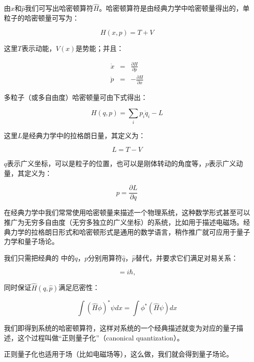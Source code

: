 由$\hat x$和$\hat p$我们可写出哈密顿算符$\hat H$。哈密顿算符是由经典力学中哈密顿量得出的，单粒子的哈密顿量可写为：

\begin{equation}
H(x,p)=T+V
\end{equation}

这里$T$表示动能，$V(x)$是势能；并且：

\begin{eqnarray}
\dot x &=& \frac{\partial H}{\partial p}  \\
\dot p &=& - \frac{\partial H}{\partial x}
\end{eqnarray}

多粒子（或多自由度）哈密顿量可由下式得出：

\begin{equation}
H(q,p) = \sum\limits_i p_i \dot q_i - L
\end{equation}

这里$L$是经典力学中的拉格朗日量，其定义为：

\begin{equation}
L = T-V
\end{equation}

$q$表示广义坐标，可以是粒子的位置，也可以是刚体转动的角度等，$p$表示广义动量，其定义为：

\begin{equation}
p = \frac{\partial L}{\partial \dot q}
\end{equation}

在经典力学中我们常常使用哈密顿量来描述一个物理系统，这种数学形式甚至可以推广为无穷多自由度（无穷多独立的广义坐标）的系统，比如用于描述电磁场。经典力学的拉格朗日形式和哈密顿形式是通用的数学语言，稍作推广就可应用于量子力学和量子场论。

我们只需把经典的 中的$q$，$p$分别用算符$\hat q$，$\hat p$替代，并要求它们满足对易关系：

\begin{equation}
[\hat x, \hat p] = i \hbar ,
\end{equation}

同时保证$\hat H (\hat q,\hat p)$满足厄密性：

\begin{equation}
\int (\hat H \phi)^* \psi dx = \int \phi^* (\hat H \psi) dx
\end{equation}

我们即得到系统的哈密顿算符，这样对系统的一个经典描述就变为对应的量子描述，这个过程叫做“正则量子化”（canonical quantization）。

正则量子化也适用于场（比如电磁场等），这么做，我们就会得到量子场论。

